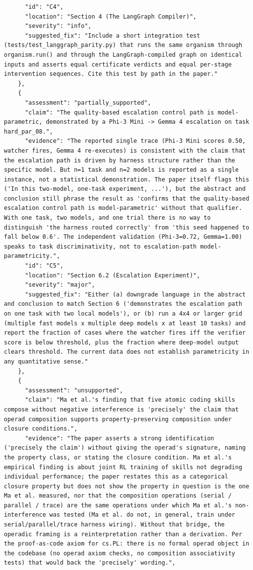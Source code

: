\documentclass[11pt]{article}
\begin{document}
\begin{verbatim}
      "id": "C4",
      "location": "Section 4 (The LangGraph Compiler)",
      "severity": "info",
      "suggested_fix": "Include a short integration test (tests/test_langgraph_parity.py) that runs the same organism through organism.run() and through the LangGraph-compiled graph on identical inputs and asserts equal certificate verdicts and equal per-stage intervention sequences. Cite this test by path in the paper."
    },
    {
      "assessment": "partially_supported",
      "claim": "The quality-based escalation control path is model-parametric, demonstrated by a Phi-3 Mini -> Gemma 4 escalation on task hard_par_08.",
      "evidence": "The reported single trace (Phi-3 Mini scores 0.50, watcher fires, Gemma 4 re-executes) is consistent with the claim that the escalation path is driven by harness structure rather than the specific model. But n=1 task and n=2 models is reported as a single instance, not a statistical demonstration. The paper itself flags this ('In this two-model, one-task experiment, ...'), but the abstract and conclusion still phrase the result as 'confirms that the quality-based escalation control path is model-parametric' without that qualifier. With one task, two models, and one trial there is no way to distinguish 'the harness routed correctly' from 'this seed happened to fall below 0.6'. The independent validation (Phi-3=0.72, Gemma=1.00) speaks to task discriminativity, not to escalation-path model-parametricity.",
      "id": "C5",
      "location": "Section 6.2 (Escalation Experiment)",
      "severity": "major",
      "suggested_fix": "Either (a) downgrade language in the abstract and conclusion to match Section 6 ('demonstrates the escalation path on one task with two local models'), or (b) run a 4x4 or larger grid (multiple fast models x multiple deep models x at least 10 tasks) and report the fraction of cases where the watcher fires iff the verifier score is below threshold, plus the fraction where deep-model output clears threshold. The current data does not establish parametricity in any quantitative sense."
    },
    {
      "assessment": "unsupported",
      "claim": "Ma et al.'s finding that five atomic coding skills compose without negative interference is 'precisely' the claim that operad composition supports property-preserving composition under closure conditions.",
      "evidence": "The paper asserts a strong identification ('precisely the claim') without giving the operad's signature, naming the property class, or stating the closure condition. Ma et al.'s empirical finding is about joint RL training of skills not degrading individual performance; the paper restates this as a categorical closure property but does not show the property in question is the one Ma et al. measured, nor that the composition operations (serial / parallel / trace) are the same operations under which Ma et al.'s non-interference was tested (Ma et al. do not, in general, train under serial/parallel/trace harness wiring). Without that bridge, the operadic framing is a reinterpretation rather than a derivation. Per the proof-as-code axiom for cs.PL: there is no formal operad object in the codebase (no operad axiom checks, no composition associativity tests) that would back the 'precisely' wording.",

\end{verbatim}
\end{document}
